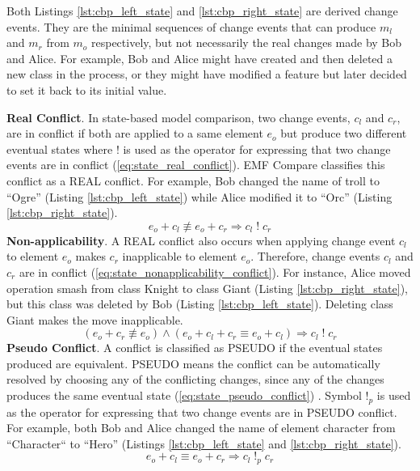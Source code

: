 Both Listings \ref{lst:cbp_left_state} and \ref{lst:cbp_right_state} are derived change events. They are the minimal sequences of change events that can produce $m_{l}$ and $m_{r}$ from $m_{o}$ respectively, but not necessarily the real changes made by Bob and Alice. For example, Bob and Alice might have created and then deleted a new class in the process, or they might have modified a feature but later decided to set it back to its initial value.

\textbf{Real Conflict}. In state-based model comparison, two change events, $c_{l}$ and $c_{r}$, are in conflict if both are applied to a same element $e_{o}$ but produce two different eventual states where $!$ is used as the operator for expressing that two change events are in conflict (\ref{eq:state_real_conflict}). EMF Compare \cite{emfcompare2018developer} classifies this conflict as a \textsf{REAL} conflict. For example, Bob changed the \textsf{name} of \textsf{troll} to “Ogre” (Listing \ref{lst:cbp_left_state}) while Alice modified it to “Orc” (Listing \ref{lst:cbp_right_state}).
\begin{equation} \label{eq:state_real_conflict}
e_{o} + c_{l} \not\equiv e_{o} + c_{r} \Rightarrow c_{l}\;!\;c_{r}
\end{equation}
\textbf{Non-applicability}. A \textsf{REAL} conflict also occurs when applying change event $c_{l}$ to element $e_{o}$ makes $c_{r}$ inapplicable to element $e_{o}$. Therefore, change events $c_{l}$ and $c_{r}$ are in conflict (\ref{eq:state_nonapplicability_conflict}).
For instance, Alice moved operation \textsf{smash} from class \textsf{Knight} to class \textsf{Giant} (Listing \ref{lst:cbp_right_state}), but this class was deleted by Bob (Listing \ref{lst:cbp_left_state}). Deleting class \textsf{Giant} makes the move inapplicable.
\begin{equation} \label{eq:state_nonapplicability_conflict}
(e_{o} + c_{r} \not\equiv e_{o}) \wedge (e_{o} + c_{l} + c_{r} \equiv e_{o} + c_{l}) \Rightarrow c_{l}\;!\;c_{r}
\end{equation}
\textbf{Pseudo Conflict}. A conflict is classified as \textsf{PSEUDO} if the eventual states produced are equivalent. \textsf{PSEUDO} means the conflict can be automatically resolved by choosing any of the conflicting changes, since any of the changes produces the same eventual state (\ref{eq:state_pseudo_conflict}) \cite{emfcompare2018developer}. Symbol $!_{p}$ is used as the operator for expressing that two change events are in \textsf{PSEUDO} conflict. For example, both Bob and Alice changed the \textsf{name} of element \textsf{character} from “Character“ to “Hero” (Listings \ref{lst:cbp_left_state} and \ref{lst:cbp_right_state}).
\begin{equation} \label{eq:state_pseudo_conflict}
e_{o} + c_{l} \equiv e_{o} + c_{r} \Rightarrow c_{l}\;!_{p}\;c_{r}
\end{equation}

